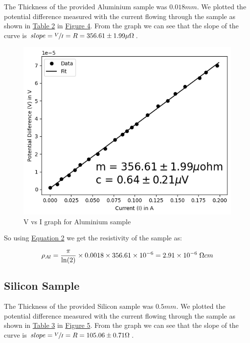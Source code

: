 		The Thickness of the provided Aluminium sample was $0.018mm$. We plotted the potential difference measured with the current flowing through the sample as shown in \hyperref[tab:2]{Table 2} in \hyperref[graph:2]{Figure 4}. From the graph we can see that the slope of the curve is $slope = \sfrac{V}{I} = R = 356.61\pm1.99\mu\ohm$.

		
		
		\begin{figure}[h]
			\centering
			\includegraphics[width=0.8\columnwidth]{images/g2.png}
			\caption{V vs I graph for Aluminium sample}
			\label{graph:2}
		\end{figure}

		So using \hyperref[eq:2]{Equation 2} we get the resistivity of the sample as:

		$$\rho_{Al} = \frac{\pi}{\ln(2)}\times0.0018\times356.61\times10^{-6} = 2.91\times10^{-6}\;\ohm cm$$

	\subsection{Silicon Sample}

		The Thickness of the provided Silicon sample was $0.5mm$. We plotted the potential difference measured with the current flowing through the sample as shown in \hyperref[tab:3]{Table 3} in \hyperref[graph:3]{Figure 5}. From the graph we can see that the slope of the curve is $slope = \sfrac{V}{I} = R = 105.06\pm0.71\ohm$.

		
		
